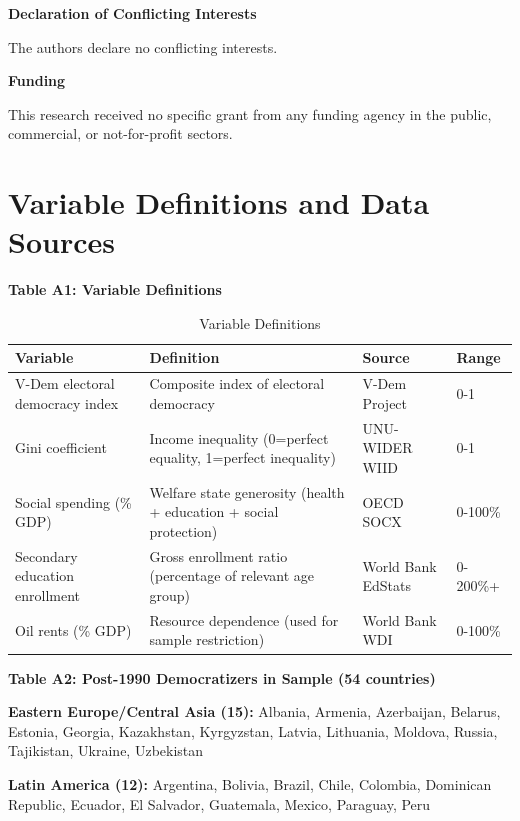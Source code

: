 \documentclass[11pt,letterpaper]{article}
\begin{document}
\textbf{Declaration of Conflicting Interests}

The authors declare no conflicting interests.

\textbf{Funding}

This research received no specific grant from any funding agency in the public, commercial, or not-for-profit sectors.

\newpage

\appendix

\section{Variable Definitions and Data Sources}

\textbf{Table A1: Variable Definitions}

\begin{table}[!htbp]
  \centering
  \caption{Variable Definitions}
  \small
  \begin{tabular}{p{3.5cm}p{4.5cm}p{4cm}l}
    \toprule
    Variable & Definition & Source & Range \\
    \midrule
    V-Dem electoral democracy index & Composite index of electoral democracy & V-Dem Project \cite{Coppedge2024} & 0-1 \\
    Gini coefficient & Income inequality (0=perfect equality, 1=perfect inequality) & UNU-WIDER WIID \cite{UNUWIDER2024} & 0-1 \\
    Social spending (\% GDP) & Welfare state generosity (health + education + social protection) & OECD SOCX \cite{OECD2025} & 0-100\% \\
    Secondary education enrollment & Gross enrollment ratio (percentage of relevant age group) & World Bank EdStats \cite{WorldBank2024} & 0-200\%+ \\
    Oil rents (\% GDP) & Resource dependence (used for sample restriction) & World Bank WDI & 0-100\% \\
    \bottomrule
  \end{tabular}
  \label{tab:vardef}
\end{table}

\textbf{Table A2: Post-1990 Democratizers in Sample (54 countries)}

\textbf{Eastern Europe/Central Asia (15):} Albania, Armenia, Azerbaijan, Belarus, Estonia, Georgia, Kazakhstan, Kyrgyzstan, Latvia, Lithuania, Moldova, Russia, Tajikistan, Ukraine, Uzbekistan

\textbf{Latin America (12):} Argentina, Bolivia, Brazil, Chile, Colombia, Dominican Republic, Ecuador, El Salvador, Guatemala, Mexico, Paraguay, Peru
\end{document}
